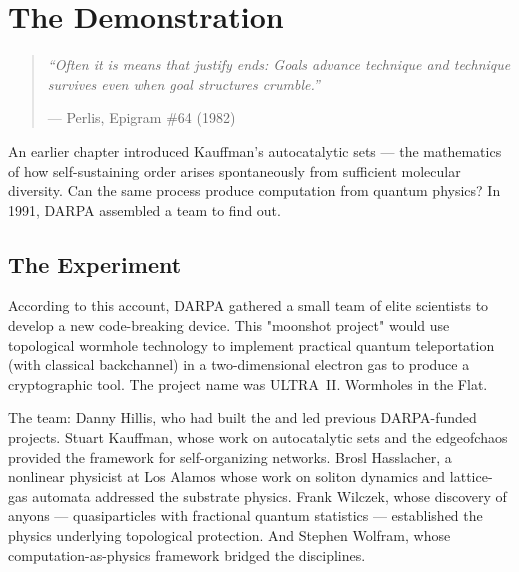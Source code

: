 
\chapter{The Demonstration}
\label{ch:the-demo}

\begin{quote}\small\textit{%
``Often it is means that justify ends: Goals advance technique and technique survives even when goal structures crumble.''%
}\par\raggedleft --- Perlis, Epigram \#64 (1982)\end{quote}

\vspace{0.5cm}


An earlier chapter introduced Kauffman's autocatalytic sets --- the mathematics of how self-sustaining order arises spontaneously from sufficient molecular diversity. Can the same process produce computation from quantum physics? In 1991, DARPA assembled a team to find out.

\section*{The Experiment}
\label{demo:the-experiment}

According to this account, DARPA gathered a small team of elite scientists to develop a new code-breaking device. This "moonshot project" would use topological wormhole technology to implement practical quantum teleportation (with classical backchannel) in a two-dimensional electron gas to produce a cryptographic tool. The project name was ULTRA~II. Wormholes in the Flat.

The team: Danny Hillis, who had built the  and led previous DARPA-funded projects. Stuart Kauffman, whose work on autocatalytic sets and the \gls{edgeofchaos} provided the framework for self-organizing networks. Brosl Hasslacher, a nonlinear physicist at Los Alamos whose work on soliton dynamics and lattice-gas automata addressed the substrate physics. Frank Wilczek, whose discovery of anyons --- quasiparticles with fractional quantum statistics --- established the physics underlying topological protection. And Stephen Wolfram, whose computation-as-physics framework bridged the disciplines.

